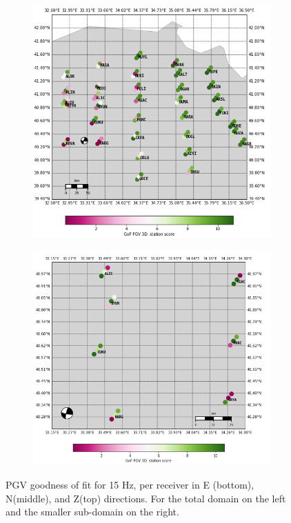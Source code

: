 \documentclass[../Text/00main.tex]{subfiles}
\begin{document}
\begin{figure}
     \centering
     \begin{subfigure}{0.4\textwidth}
         \centering
         \includegraphics[width=\textwidth]{images_results/GoFmapPGV_large.png}
         \label{fig:y equals x}
     \end{subfigure}
     \hfill
     \begin{subfigure}{0.4\textwidth}
         \centering
         \includegraphics[width=\textwidth]{images_results/GoFmapPGV_smalle.png}
       
         \label{fig:three sin x}
     \end{subfigure}
     \caption{PGV goodness of fit for 15 Hz, per receiver in E (bottom), N(middle), and Z(top) directions. For the total domain on the left and the smaller sub-domain on the right.}
    \label{fig:gofmapsPGV_small}
\end{figure}
\end{document}
